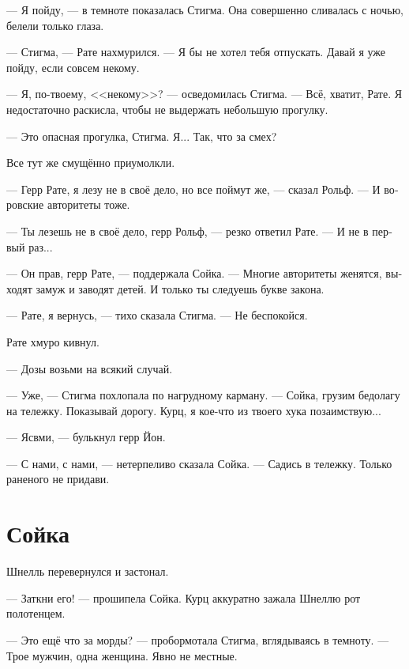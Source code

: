 \documentclass[a4paper,12pt,fleqn]{book}\usepackage{polyglossia}\setdefaultlanguage[babelshorthands=true]{russian}\setotherlanguage{english}\defaultfontfeatures{Ligatures=TeX,Mapping=tex-text}\usepackage{xcolor}\newcommand{\ml}[3]{#2}
\begin{document}
--- Я пойду, --- в темноте показалась Стигма.
Она совершенно сливалась с ночью, белели только глаза.

--- Стигма, --- Рате нахмурился.
--- Я бы не хотел тебя отпускать.
\ml{$0$}
{Давай я уже пойду, если совсем некому.}
{Let me go, if no one else can.''}

\ml{$0$}
{--- Я, по-твоему, <<некому>>? --- осведомилась Стигма.}
{``I am, you say, `no one else'?'' Stigma coldly asked.}
\ml{$0$}
{--- Всё, хватит, Рате.}
{``Stop that shit, Rate.}
\ml{$0$}
{Я недостаточно раскисла, чтобы не выдержать небольшую прогулку.}
{I'm definitely not bad enough to fail a little walk.''}

--- Это опасная прогулка, Стигма.
Я...
Так, что за смех?

Все тут же смущённо приумолкли.

--- Герр Рате, я лезу не в своё дело, но все поймут же, --- сказал Рольф.
--- И воровские авторитеты тоже.

--- Ты лезешь не в своё дело, герр Рольф, --- резко ответил Рате.
--- И не в первый раз...

--- Он прав, герр Рате, --- поддержала Сойка.
--- Многие авторитеты женятся, выходят замуж и заводят детей.
И только ты следуешь букве закона.

--- Рате, я вернусь, --- тихо сказала Стигма.
--- Не беспокойся.

Рате хмуро кивнул.

\ml{$0$}
{--- Дозы возьми на всякий случай.}
{``Take your fix for safety.''}

\ml{$0$}
{--- Уже, --- Стигма похлопала по нагрудному карману.}
{``Already have,'' Stigma patted her breast-pocket.}
--- Сойка, грузим бедолагу на тележку.
Показывай дорогу.
Курц, я кое-что из твоего хука позаимствую...

--- Ясвми, --- булькнул герр Йон.

--- С нами, с нами, --- нетерпеливо сказала Сойка.
--- Садись в тележку.
Только раненого не придави.

\section{Сойка}

Шнелль перевернулся и застонал.

--- Заткни его! --- прошипела Сойка.
Курц аккуратно зажала Шнеллю рот полотенцем.

--- Это ещё что за морды? --- пробормотала Стигма, вглядываясь в темноту.
--- Трое мужчин, одна женщина.
Явно не местные.
\end{document}
